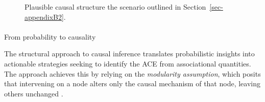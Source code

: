 \documentclass[
  authoryear,
  review,
  1p]{elsarticle}
\makeatletter
\let\oldparagraph\paragraph
\renewcommand{\paragraph}{
    \@ifstar
      \xxxParagraphStar
      \xxxParagraphNoStar
  }
\newcommand{\xxxParagraphStar}[1]{\oldparagraph*{#1}\mbox{}}
\newcommand{\xxxParagraphNoStar}[1]{\oldparagraph{#1}\mbox{}}
\makeatother
\begin{document}
\begin{figure}

\begin{minipage}{0.50\linewidth}

\centering{

\[
\begin{aligned}
  X & := x \\
  T & := f_{T}(x,e_{T}) \\
  Y & := f_{Y}(T,x,e_{Y}) \\
  e_{T} & \:\bot\:e_{X} \\
  e_{T} & \:\bot\:e_{Y} \\
  e_{X} & \:\bot\:e_{Y}
\end{aligned}
\]

}


\end{minipage}%
%
\begin{minipage}{0.50\linewidth}



\end{minipage}%

\caption{\label{fig-example2}Plausible causal structure the scenario
outlined in Section~\ref{sec-appendixB2}.}

\end{figure}%

\paragraph{From probability to causality}\label{sec-appendixB33}

The structural approach to causal inference translates probabilistic
insights into actionable strategies seeking to identify the ACE from
associational quantities. The approach achieves this by relying on the
\emph{modularity assumption}, which posits that intervening on a node
alters only the causal mechanism of that node, leaving others unchanged
\citep[pp.~34]{Neal_2020}.
\end{document}
